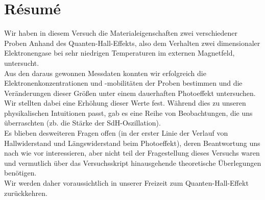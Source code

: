 \section{R\'esum\'e}
Wir haben in diesem Versuch die Materialeigenschaften zwei verschiedener Proben Anhand des Quanten-Hall-Effekts, also dem Verhalten zwei dimensionaler Elektronengase bei sehr niedrigen Temperaturen im externen Magnetfeld, untersucht. \\

Aus den daraus gewonnen Messdaten konnten wir erfolgreich die Elektronenkonzentrationen und -mobilitäten der Proben bestimmen und die Veränderungen dieser Größen unter einem dauerhaften Photoeffekt untersuchen. Wir stellten dabei eine Erhöhung dieser Werte fest. 
Während dies zu unseren physikalischen Intuitionen passt, gab es eine Reihe von Beobachtungen, die uns überraschten (zb. die Stärke der SdH-Oszillation). \\

Es blieben desweiteren Fragen offen (in der erster Linie der Verlauf von Hallwiderstand und Längswiderstand beim Photoeffekt), deren Beantwortung uns nach wie vor interessieren, aber nicht teil der Fragestellung dieses Versuchs waren und vermutlich über das Versuchsskript hinausgehende theoretische Überlegungen benötigen.\\

Wir werden daher voraussichtlich in unserer Freizeit zum Quanten-Hall-Effekt zurückkehren. 
